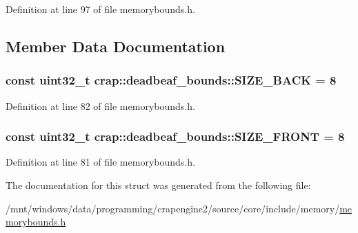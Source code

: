 Definition at line 97 of file memorybounds.\+h.



\subsection{Member Data Documentation}
\hypertarget{structcrap_1_1deadbeaf__bounds_a83d1119c597f6e36b2daf83922a1ec6e}{
\subsubsection[{S\+I\+Z\+E\+\_\+\+B\+A\+C\+K}]{\setlength{\rightskip}{0pt plus 5cm}const uint32\+\_\+t crap\+::deadbeaf\+\_\+bounds\+::\+S\+I\+Z\+E\+\_\+\+B\+A\+C\+K = 8\hspace{0.3cm}{\ttfamily [static]}}}\label{structcrap_1_1deadbeaf__bounds_a83d1119c597f6e36b2daf83922a1ec6e}


Definition at line 82 of file memorybounds.\+h.

\hypertarget{structcrap_1_1deadbeaf__bounds_af8de969a7504a7bc2bc13f8fc478b764}{
\subsubsection[{S\+I\+Z\+E\+\_\+\+F\+R\+O\+N\+T}]{\setlength{\rightskip}{0pt plus 5cm}const uint32\+\_\+t crap\+::deadbeaf\+\_\+bounds\+::\+S\+I\+Z\+E\+\_\+\+F\+R\+O\+N\+T = 8\hspace{0.3cm}{\ttfamily [static]}}}\label{structcrap_1_1deadbeaf__bounds_af8de969a7504a7bc2bc13f8fc478b764}


Definition at line 81 of file memorybounds.\+h.



The documentation for this struct was generated from the following file\+:\begin{DoxyCompactItemize}
\item 
/mnt/windows/data/programming/crapengine2/source/core/include/memory/\hyperlink{memorybounds_8h}{memorybounds.\+h}\end{DoxyCompactItemize}
